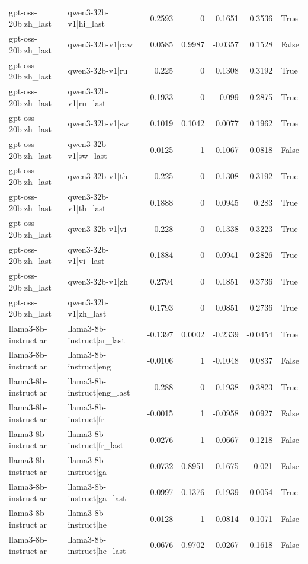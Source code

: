 \begin{table}
\begin{tabular}{l l r r r r l}
gpt-oss-20b|zh_last & qwen3-32b-v1|hi_last & 0.2593 & 0 & 0.1651 & 0.3536 & True \\
gpt-oss-20b|zh_last & qwen3-32b-v1|raw & 0.0585 & 0.9987 & -0.0357 & 0.1528 & False \\
gpt-oss-20b|zh_last & qwen3-32b-v1|ru & 0.225 & 0 & 0.1308 & 0.3192 & True \\
gpt-oss-20b|zh_last & qwen3-32b-v1|ru_last & 0.1933 & 0 & 0.099 & 0.2875 & True \\
gpt-oss-20b|zh_last & qwen3-32b-v1|sw & 0.1019 & 0.1042 & 0.0077 & 0.1962 & True \\
gpt-oss-20b|zh_last & qwen3-32b-v1|sw_last & -0.0125 & 1 & -0.1067 & 0.0818 & False \\
gpt-oss-20b|zh_last & qwen3-32b-v1|th & 0.225 & 0 & 0.1308 & 0.3192 & True \\
gpt-oss-20b|zh_last & qwen3-32b-v1|th_last & 0.1888 & 0 & 0.0945 & 0.283 & True \\
gpt-oss-20b|zh_last & qwen3-32b-v1|vi & 0.228 & 0 & 0.1338 & 0.3223 & True \\
gpt-oss-20b|zh_last & qwen3-32b-v1|vi_last & 0.1884 & 0 & 0.0941 & 0.2826 & True \\
gpt-oss-20b|zh_last & qwen3-32b-v1|zh & 0.2794 & 0 & 0.1851 & 0.3736 & True \\
gpt-oss-20b|zh_last & qwen3-32b-v1|zh_last & 0.1793 & 0 & 0.0851 & 0.2736 & True \\
llama3-8b-instruct|ar & llama3-8b-instruct|ar_last & -0.1397 & 0.0002 & -0.2339 & -0.0454 & True \\
llama3-8b-instruct|ar & llama3-8b-instruct|eng & -0.0106 & 1 & -0.1048 & 0.0837 & False \\
llama3-8b-instruct|ar & llama3-8b-instruct|eng_last & 0.288 & 0 & 0.1938 & 0.3823 & True \\
llama3-8b-instruct|ar & llama3-8b-instruct|fr & -0.0015 & 1 & -0.0958 & 0.0927 & False \\
llama3-8b-instruct|ar & llama3-8b-instruct|fr_last & 0.0276 & 1 & -0.0667 & 0.1218 & False \\
llama3-8b-instruct|ar & llama3-8b-instruct|ga & -0.0732 & 0.8951 & -0.1675 & 0.021 & False \\
llama3-8b-instruct|ar & llama3-8b-instruct|ga_last & -0.0997 & 0.1376 & -0.1939 & -0.0054 & True \\
llama3-8b-instruct|ar & llama3-8b-instruct|he & 0.0128 & 1 & -0.0814 & 0.1071 & False \\
llama3-8b-instruct|ar & llama3-8b-instruct|he_last & 0.0676 & 0.9702 & -0.0267 & 0.1618 & False \\

\end{tabular}
\end{table}
